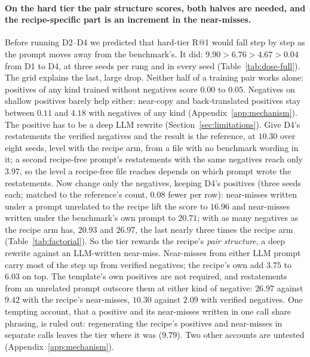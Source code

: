 \paragraph{On the hard tier the pair structure scores, both halves are needed, and the recipe-specific part is an increment in the near-misses.}
Before running D2--D4 we predicted that hard-tier R@1 would fall step by step as the prompt moves away from the benchmark's. It did: $9.90 > 6.76 > 4.67 > 0.04$ from D1 to D4, at three seeds per rung and in every seed (Table~\ref{tab:dose-full}). The grid explains the last, large drop. Neither half of a training pair works alone: positives of any kind trained without negatives score $0.00$ to $0.05$. Negatives on shallow positives barely help either: near-copy and back-translated positives stay between $0.11$ and $4.18$ with negatives of any kind (Appendix~\ref{app:mechanism}). The positive has to be a deep LLM rewrite (Section~\ref{sec:limitations}). Give D4's restatements the verified negatives and the result is the reference, at $10.30$ over eight seeds, level with the recipe arm, from a file with no benchmark wording in it; a second recipe-free prompt's restatements with the same negatives reach only $3.97$, so the level a recipe-free file reaches depends on which prompt wrote the restatements. Now change only the negatives, keeping D4's positives (three seeds each; matched to the reference's count, $0.08$ fewer per row): near-misses written under a prompt unrelated to the recipe lift the score to $16.96$ and near-misses written under the benchmark's own prompt to $20.71$; with as many negatives as the recipe arm has, $20.93$ and $26.97$, the last nearly three times the recipe arm (Table~\ref{tab:factorial}). So the tier rewards the recipe's \emph{pair structure}, a deep rewrite against an LLM-written near-miss. Near-misses from either LLM prompt carry most of the step up from verified negatives; the recipe's own add $3.75$ to $6.03$ on top. The template's own positives are not required, and restatements from an unrelated prompt outscore them at either kind of negative: $26.97$ against $9.42$ with the recipe's near-misses, $10.30$ against $2.09$ with verified negatives. One tempting account, that a positive and its near-misses written in one call share phrasing, is ruled out: regenerating the recipe's positives and near-misses in separate calls leaves the tier where it was ($9.79$). Two other accounts are untested (Appendix~\ref{app:mechanism}).

